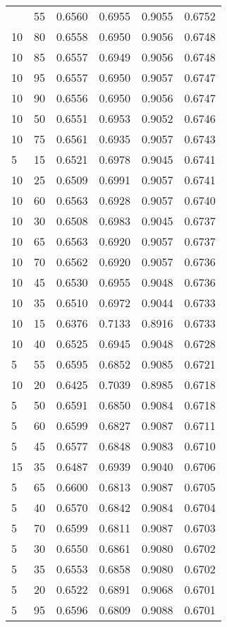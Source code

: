 \begin{center}
\begin{longtable}{|l|l|l|l|l|l|}
\hline \hline
\endlastfoot
10 & 55 & 0.6560 & 0.6955 & 0.9055 & 0.6752 \\
10 & 80 & 0.6558 & 0.6950 & 0.9056 & 0.6748 \\
10 & 85 & 0.6557 & 0.6949 & 0.9056 & 0.6748 \\
10 & 95 & 0.6557 & 0.6950 & 0.9057 & 0.6747 \\
10 & 90 & 0.6556 & 0.6950 & 0.9056 & 0.6747 \\
10 & 50 & 0.6551 & 0.6953 & 0.9052 & 0.6746 \\
10 & 75 & 0.6561 & 0.6935 & 0.9057 & 0.6743 \\
5  & 15 & 0.6521 & 0.6978 & 0.9045 & 0.6741 \\
10 & 25 & 0.6509 & 0.6991 & 0.9057 & 0.6741 \\
10 & 60 & 0.6563 & 0.6928 & 0.9057 & 0.6740 \\
10 & 30 & 0.6508 & 0.6983 & 0.9045 & 0.6737 \\
10 & 65 & 0.6563 & 0.6920 & 0.9057 & 0.6737 \\
10 & 70 & 0.6562 & 0.6920 & 0.9057 & 0.6736 \\
10 & 45 & 0.6530 & 0.6955 & 0.9048 & 0.6736 \\
10 & 35 & 0.6510 & 0.6972 & 0.9044 & 0.6733 \\
10 & 15 & 0.6376 & 0.7133 & 0.8916 & 0.6733 \\
10 & 40 & 0.6525 & 0.6945 & 0.9048 & 0.6728 \\
5  & 55 & 0.6595 & 0.6852 & 0.9085 & 0.6721 \\
10 & 20 & 0.6425 & 0.7039 & 0.8985 & 0.6718 \\
5  & 50 & 0.6591 & 0.6850 & 0.9084 & 0.6718 \\
5  & 60 & 0.6599 & 0.6827 & 0.9087 & 0.6711 \\
5  & 45 & 0.6577 & 0.6848 & 0.9083 & 0.6710 \\
15 & 35 & 0.6487 & 0.6939 & 0.9040 & 0.6706 \\
5  & 65 & 0.6600 & 0.6813 & 0.9087 & 0.6705 \\
5  & 40 & 0.6570 & 0.6842 & 0.9084 & 0.6704 \\
5  & 70 & 0.6599 & 0.6811 & 0.9087 & 0.6703 \\
5  & 30 & 0.6550 & 0.6861 & 0.9080 & 0.6702 \\
5  & 35 & 0.6553 & 0.6858 & 0.9080 & 0.6702 \\
5  & 20 & 0.6522 & 0.6891 & 0.9068 & 0.6701 \\
5  & 95 & 0.6596 & 0.6809 & 0.9088 & 0.6701 \\

\end{longtable}
\end{center}

